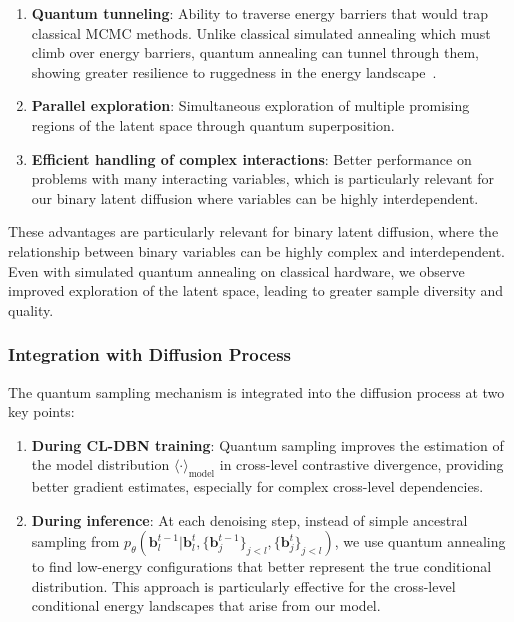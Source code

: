 \documentclass[10pt,twocolumn,letterpaper]{article}
\newcommand{\bm}[1]{\boldsymbol{#1}}
\newcommand{\binary}{\bm{b}}
\begin{document}
\begin{enumerate}
    \item \textbf{Quantum tunneling}: Ability to traverse energy barriers that would trap classical MCMC methods. Unlike classical simulated annealing which must climb over energy barriers, quantum annealing can tunnel through them, showing greater resilience to ruggedness in the energy landscape~\cite{kirkpatrick1983optimization, kadowaki1998quantum}.
    \item \textbf{Parallel exploration}: Simultaneous exploration of multiple promising regions of the latent space through quantum superposition.
    \item \textbf{Efficient handling of complex interactions}: Better performance on problems with many interacting variables, which is particularly relevant for our binary latent diffusion where variables can be highly interdependent.
\end{enumerate}

These advantages are particularly relevant for binary latent diffusion, where the relationship between binary variables can be highly complex and interdependent. Even with simulated quantum annealing on classical hardware, we observe improved exploration of the latent space, leading to greater sample diversity and quality.

\subsubsection{Integration with Diffusion Process}

The quantum sampling mechanism is integrated into the diffusion process at two key points:

\begin{enumerate}
    \item \textbf{During CL-DBN training}: Quantum sampling improves the estimation of the model distribution $\langle \cdot \rangle_{\text{model}}$ in cross-level contrastive divergence, providing better gradient estimates, especially for complex cross-level dependencies.
    
    \item \textbf{During inference}: At each denoising step, instead of simple ancestral sampling from $p_\theta(\binary_l^{t-1}|\binary_l^t, \{\binary_j^{t-1}\}_{j<l}, \{\binary_j^{t}\}_{j<l})$, we use quantum annealing to find low-energy configurations that better represent the true conditional distribution. This approach is particularly effective for the cross-level conditional energy landscapes that arise from our model.
\end{enumerate}
\end{document}

